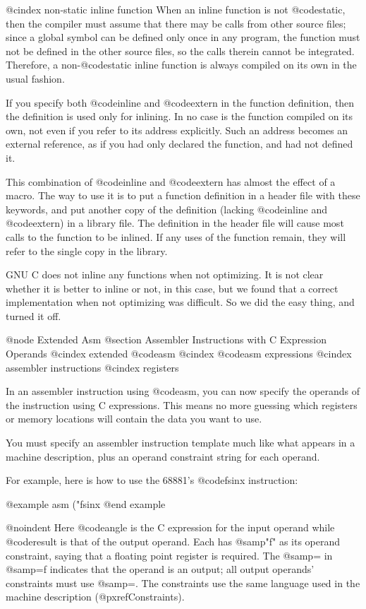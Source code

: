 {@cindex non-static inline function
When an inline function is not @code{static}, then the compiler must assume
that there may be calls from other source files; since a global symbol can
be defined only once in any program, the function must not be defined in
the other source files, so the calls therein cannot be integrated.
Therefore, a non-@code{static} inline function is always compiled on its
own in the usual fashion.

If you specify both @code{inline} and @code{extern} in the function
definition, then the definition is used only for inlining.  In no case
is the function compiled on its own, not even if you refer to its
address explicitly.  Such an address becomes an external reference, as
if you had only declared the function, and had not defined it.

This combination of @code{inline} and @code{extern} has almost the
effect of a macro.  The way to use it is to put a function definition in
a header file with these keywords, and put another copy of the
definition (lacking @code{inline} and @code{extern}) in a library file.
The definition in the header file will cause most calls to the function
to be inlined.  If any uses of the function remain, they will refer to
the single copy in the library.

GNU C does not inline any functions when not optimizing.  It is not
clear whether it is better to inline or not, in this case, but we found
that a correct implementation when not optimizing was difficult.  So we
did the easy thing, and turned it off.

@node Extended Asm
@section Assembler Instructions with C Expression Operands
@cindex extended @code{asm}
@cindex @code{asm} expressions
@cindex assembler instructions
@cindex registers

In an assembler instruction using @code{asm}, you can now specify the
operands of the instruction using C expressions.  This means no more
guessing which registers or memory locations will contain the data you want
to use.

You must specify an assembler instruction template much like what appears
in a machine description, plus an operand constraint string for each
operand.

For example, here is how to use the 68881's @code{fsinx} instruction:

@example
asm ("fsinx %
@end example

@noindent
Here @code{angle} is the C expression for the input operand while
@code{result} is that of the output operand.  Each has @samp{"f"} as its
operand constraint, saying that a floating point register is required.  The
@samp{=} in @samp{=f} indicates that the operand is an output; all output
operands' constraints must use @samp{=}.  The constraints use the same
language used in the machine description (@pxref{Constraints}).

}
